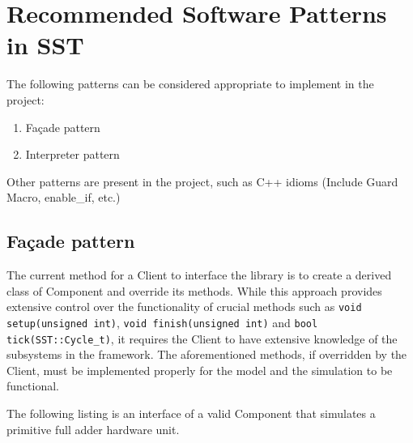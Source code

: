 \documentclass[titlepage]{article}
\begin{document}
\section{Recommended Software Patterns in SST}
The following patterns can be considered appropriate to implement in the project:
\begin{enumerate}
    \item Façade pattern
    \item Interpreter pattern
\end{enumerate}
Other patterns are present in the project, such as C++ idioms (Include Guard Macro, enable\_if, etc.)

\subsection{Façade pattern}
The current method for a Client to interface the library is to create a derived class of Component and override its methods. While this approach provides extensive control over the functionality of crucial methods such as \texttt{void setup(unsigned int)}, \texttt{void finish(unsigned int)} and \texttt{bool tick(SST::Cycle\_t)}, it requires the Client to have extensive knowledge of the subsystems in the framework. The aforementioned methods, if overridden by the Client, must be implemented properly for the model and the simulation to be functional.

The following listing is an interface of a valid Component that simulates a primitive full adder hardware unit.
\end{document}
